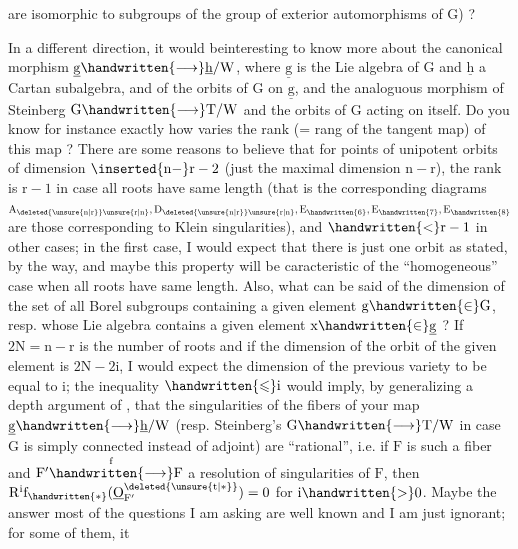 are isomorphic to subgroups of the group of exterior automorphisms of $\mathrm{G}$) ?

In a different direction, it would be\handwritten{\raisebox{.6ex}{$\vert$}}interesting to know more about the canonical morphism $\underline{\mathrm{g}}\handwritten{\longrightarrow}\underline{\mathrm{h}}/\mathrm{W}$, where $\underline{\mathrm{g}}$ is the Lie algebra of $\mathrm{G}$ and $\underline{\mathrm{h}}$ a Cartan subalgebra, and of the orbits of $\mathrm{G}$ on $\underline{\mathrm{g}}$, and the analoguous morphism of Steinberg $\mathrm{G}\handwritten{\longrightarrow}\mathrm{T}/\mathrm{W}$ and the orbits of $\mathrm{G}$ acting on itself. Do you know for instance exactly how varies the rank (= rang of the tangent map) of this  map ? There are some reasons to believe that  for points of unipotent orbits of dimension $\inserted{\mathrm{n}-}\mathrm{r}-2$ (just  the maximal dimension $\mathrm{n}-\mathrm{r}$), the rank is $\mathrm{r}-1$ in case all roots have same length (that is the corresponding diagrams $\mathrm{A}_{\deleted{\unsure{\mathrm{n}|\mathrm{r}}}\unsure{\mathrm{r}|\mathrm{n}}},\mathrm{D}_{\deleted{\unsure{\mathrm{n}|\mathrm{r}}}\unsure{\mathrm{r}|\mathrm{n}}},\mathrm{E}_{\handwritten{6}},\mathrm{E}_{\handwritten{7}},\mathrm{E}_{\handwritten{8}}$ are those corresponding to Klein singularities), and $\handwritten{<}\mathrm{r}-1$ in  other cases; in the first case, I would expect that there is just one orbit as stated, by the way, and maybe this property will be caracteristic of the ``homogeneous'' case when all roots have same length. Also, what can be said of the dimension of the set of all Borel subgroups containing a given element $\mathrm{g}\handwritten{\in}\mathrm{G}$, resp. whose Lie algebra contains a given element $\mathrm{x}\handwritten{\in}\underline{\mathrm{g}}$ ? If $2\mathrm{N}=\mathrm{n}-\mathrm{r}$ is the number of roots and if the dimension of the orbit of the given element is $2\mathrm{N}-2\mathrm{i}$, I would expect the dimension of the previous variety to be equal to $\mathrm{i}$; the inequality $\handwritten{\leqslant}\mathrm{i}$ would imply, by generalizing a depth argument of , that the singularities of the fibers of your map $\underline{\mathrm{g}}\handwritten{\longrightarrow}\underline{\mathrm{h}}/\mathrm{W}$ (resp. Steinberg's $\mathrm{G}\handwritten{\longrightarrow}\mathrm{T}/\mathrm{W}$ in case $\mathrm{G}$ is simply connected instead of adjoint) are ``rational'', i.e. if $\mathrm{F}$ is such a fiber and $\mathrm{F}'\overset{\mathrm{f}}{\handwritten{\longrightarrow}}\mathrm{F}$ a resolution of singularities of $\mathrm{F}$, then $\mathrm{R}^{\mathrm{i}}\mathrm{f}_{\handwritten{*}}(\underline{\mathrm{O}}_{\mathrm{F}'}^{\deleted{\unsure{\mathrm{t}|*}}})=0$ for $\mathrm{i}\handwritten{>}0$. Maybe the answer  most of the questions I am asking are well known and I am just ignorant; for some of them, it 